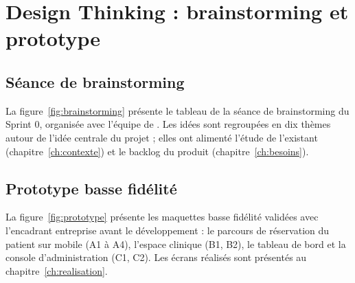 \chapter{Design Thinking : brainstorming et prototype}\label{annexe:design-thinking}


\section{Séance de brainstorming}
La figure~\ref{fig:brainstorming} présente le tableau de la séance de brainstorming du Sprint 0, organisée avec l'équipe de \entreprise. Les idées sont regroupées en dix thèmes autour de l'idée centrale du projet ; elles ont alimenté l'étude de l'existant (chapitre~\ref{ch:contexte}) et le backlog du produit (chapitre~\ref{ch:besoins}).


\section{Prototype basse fidélité}
La figure~\ref{fig:prototype} présente les maquettes basse fidélité validées avec l'encadrant entreprise avant le développement : le parcours de réservation du patient sur mobile (A1 à A4), l'espace clinique (B1, B2), le tableau de bord et la console d'administration (C1, C2). Les écrans réalisés sont présentés au chapitre~\ref{ch:realisation}.

